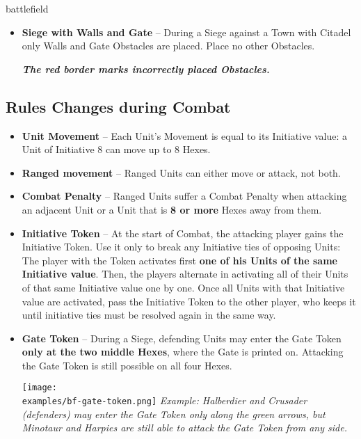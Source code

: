 \newpage
\begin{expansion}{battlefield}
  \begin{multicols*}{2}
  \begin{itemize}
    \item \textbf{Siege with Walls and Gate} – During a Siege against a Town with Citadel only Walls and Gate Obstacles are placed. Place no other Obstacles.

    {\footnotesize\textbf{\textit{\textcolor{darkcandyapplered}{The red border marks incorrectly placed Obstacles.}}}}
  \end{itemize}
  \subsection*{Rules Changes during Combat}
  \begin{itemize}
    \item \textbf{Unit Movement} – Each Unit's Movement is equal to its Initiative value: a Unit of Initiative 8 can move up to 8 Hexes.
    \item \textbf{Ranged movement}  – Ranged  Units can either move or attack, not both.
    \item \textbf{Combat Penalty} – Ranged  Units suffer a Combat Penalty when attacking an adjacent Unit or a Unit that is \textbf{8 or more} Hexes away from them.
    \columnbreak
    \item \textbf{Initiative Token} – At the start of Combat, the attacking player gains the Initiative Token.
    Use it only to break any Initiative ties of opposing Units:
    The player with the Token activates first \textbf{one of his Units of the same Initiative value}.
    Then, the players alternate in activating all of their Units of that same Initiative value one by one.
    Once all Units with that Initiative value are activated, pass the Initiative Token to the other player, who keeps it until initiative ties must be resolved again in the same way.
    \item \textbf{Gate Token} – During a Siege, defending Units may enter the Gate Token \textbf{only at the two middle Hexes}, where the Gate is printed on.
    Attacking the Gate Token is still possible on all four Hexes.

    \vspace*{1em}
    \texttt{[image: \\examples/bf-gate-token.png]}
    \footnotesize\textit{Example: Halberdier and Crusader (defenders) may enter the Gate Token only along the green arrows, but Minotaur and Harpies are still able to attack the Gate Token from any side.}
  \end{itemize}
  \end{multicols*}
\end{expansion}

